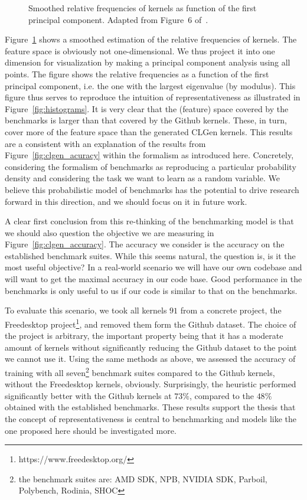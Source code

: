 \begin{figure}[h]
	\centering
\resizebox{0.95\textwidth}{!}{
     
     }
   \caption{Smoothed relative frequencies of kernels as function of the first principal component. Adapted from Figure~6 of~\cite{goens_mapl19}.}
   \label{fig:clgen_pca}
\end{figure}

Figure~\ref{fig:clgen_pca} shows a smoothed estimation of the relative frequencies of kernels. The feature space is obviously not one-dimensional. We thus project it into one dimension for visualization by making a principal component analysis using all points.
The figure shows the relative frequencies as a function of the first principal component, i.e. the one with the largest eigenvalue (by modulus). 
This figure thus serves to reproduce the intuition of representativeness as illustrated in Figure~\ref{fig:histograms}.
It is very clear that the (feature) space covered by the benchmarks is larger than that covered by the Github kernels. These, in turn, cover more of the feature space than the generated CLGen kernels.
This results are a consistent with an explanation of the results from Figure~\ref{fig:clgen_acuracy} within the formalism as introduced here.
Concretely, considering the formalism of benchmarks as reproducing a particular probability density and considering the task we want to learn as a random variable.
We believe this probabilistic model of benchmarks has the potential to drive research forward in this direction, and we should focus on it in future work.

A clear first conclusion from this re-thinking of the benchmarking model is that we should also question the objective we are measuring in Figure~\ref{fig:clgen_accuracy}.
The accuracy we consider is the accuracy on the established benchmark suites.
While this seems natural, the question is, is it the most useful objective?
In a real-world scenario we will have our own codebase and will want to get the maximal accuracy in our code base.
Good performance in the benchmarks is only useful to us if our code is similar to that on the benchmarks. 

To evaluate this scenario, we took all kernels $91$ from a concrete project, the Freedesktop project\footnote{https://www.freedesktop.org/}, and removed them form the Github dataset.
The choice of the project is arbitrary, the important property being that it has a moderate amount of kernels without significantly reducing the Github dataset to the point we cannot use it.
Using the same methods as above, we assessed the accuracy of training with all seven\footnote{the benchmark suites are: AMD SDK, NPB, NVIDIA SDK, Parboil, Polybench, Rodinia, SHOC} benchmark suites compared to the Github kernels, without the Freedesktop kernels, obviously.
Surprisingly, the heuristic performed significantly better with the Github kernels at $73\%$, compared to the $48\%$ obtained with the established benchmarks.
These results support the thesis that the concept of representativeness is central to benchmarking and models like the one proposed here should be investigated more.

